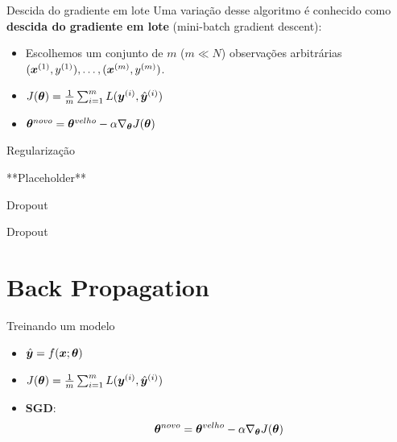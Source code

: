 \documentclass[10pt]{beamer}
\begin{document}
\begin{frame}[fragile]{Descida do gradiente em lote}
Uma variação desse algoritmo é conhecido como \textbf{descida do gradiente em lote} (\alert{mini-batch gradient descent}):

\begin{itemize}
\item Escolhemos um conjunto de $m$ ($m \ll N$) observações arbitrárias $(\bm{x}^{(1)},y^{(1)}), \dots, (\bm{x}^{(m)},y^{(m)})$.
\vspace{0.3cm}
\item $J(\bm{\theta}) =  \frac{1}{m}\sum_{i=1}^{m} L(\bm{y}^{(i)}, {\hat{\bm{y}}}^{(i)})$
\vspace{0.3cm}
\item $\bm{\theta}^{novo} = \bm{\theta}^{velho} - \alpha \nabla_{\bm{\theta}} {J(\bm{\theta})}$
\end{itemize}
\end{frame}

\begin{frame}[fragile]{Regularização}


**Placeholder**


\end{frame}

\begin{frame}[fragile]{Dropout}

\end{frame}

\begin{frame}[fragile]{Dropout}

\end{frame}

\section{Back Propagation}

\begin{frame}{Treinando um modelo}
\Large{
\begin{itemize}
\item $\hat{\bm{y}} = f(\bm{x}; \bm{\theta})$ 
\item $J(\bm{\theta}) =  \frac{1}{m}\sum_{i=1}^{m} L(\bm{y}^{(i)}, {\hat{\bm{y}}}^{(i)})$ 
\item \textbf{SGD}:
\begin{equation*}
\bm{\theta}^{novo} = \bm{\theta}^{velho} - \alpha \nabla_{\bm{\theta}} {J(\bm{\theta})}
\end{equation*}
\vspace{0.3cm}
\end{itemize}
}

\end{frame}
\end{document}
